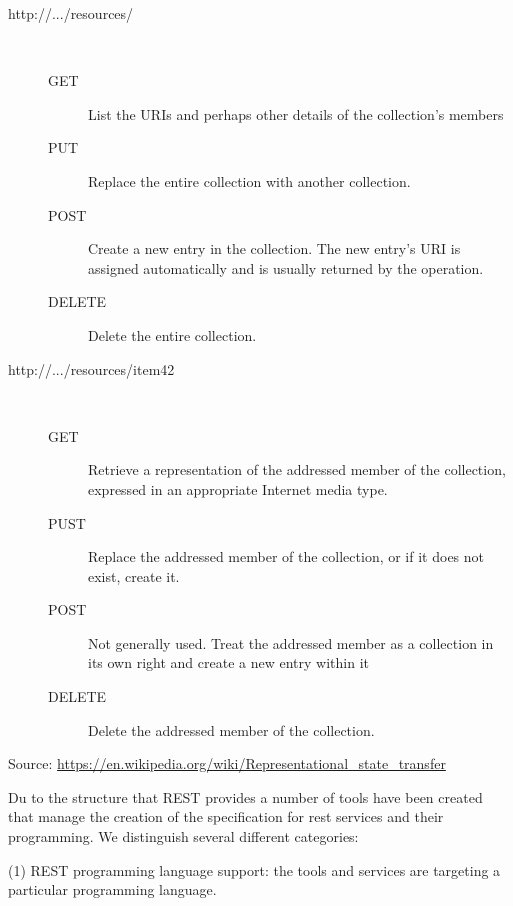 \begin{description}

\item[http://.../resources/] ~\\

    \begin{description} 
    \item[GET] List the URIs and perhaps other details of the
      collection’s members
    \item[PUT] Replace the entire collection with another collection.
    \item[POST] Create a new entry in the collection. The new entry’s
      URI is assigned automatically and is usually returned by the
      operation.
    \item[DELETE] Delete the entire collection.
\end{description} 

\item[http://.../resources/item42] ~\\

    \begin{description} 

    \item[GET] Retrieve a representation of the addressed member of
      the collection, expressed in an appropriate Internet media type.

    \item[PUST] Replace the addressed member of the collection, or if
      it does not exist, create it.

    \item[POST] Not generally used. Treat the addressed member as a
      collection in its own right and create a new entry within it
                               
\item[DELETE] Delete the addressed member of the collection. 
\end{description} 
\end{description}

Source:
\url{https://en.wikipedia.org/wiki/Representational_state_transfer}


Du to the structure that REST provides a number of tools have been
created that manage the creation of the specification for rest
services and their programming. We distinguish several different
categories:

(1) REST programming language support: the tools and services are
targeting a particular programming language.


